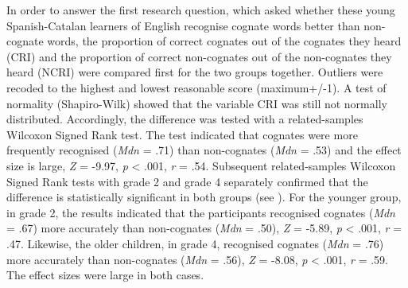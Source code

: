 \documentclass[output=paper,modfonts,nonflat,newtxmath]{langsci/langscibook}
\begin{document}
\begin{table}
\caption{Descriptive statistics}
\label{tab:munoz:1}
\end{table}

{In order to answer the first research question, which asked whether these young Spanish-Catalan learners of English recognise cognate words better than non-cognate words, the proportion of correct cognates out of the cognates they heard (CRI) and the proportion of correct non-cognates out of the non-cognates they heard (NCRI) were compared first for the two groups together. Outliers were recoded to the highest and lowest reasonable score (maximum+/-1). A test of normality (Shapiro-Wilk) showed that the variable CRI was still not normally distributed. Accordingly, the difference was tested with a related-samples Wilcoxon Signed Rank test. The test indicated that cognates were more frequently recognised (}{\textit{Mdn}} {= .71) than non-cognates (}{\textit{Mdn}} {= .53) and the effect size is large,} {\textit{Z} }{= -9.97,} {\textit{p} }{< .001,} {\textit{r} }{= .54. Subsequent related-samples Wilcoxon Signed Rank tests with grade 2 and grade 4 separately confirmed that the difference is statistically significant in both groups (see ). For the younger group, in grade 2, the results indicated that the participants recognised cognates (}{\textit{Mdn}} {= .67) more accurately than non-cognates (}{\textit{Mdn}} {= .50),} {\textit{Z} }{= -5.89,} {\textit{p} }{< .001,} {\textit{r} }{= .47. Likewise, the older children, in grade 4, recognised cognates (}{\textit{Mdn}} {= .76) more accurately than non-cognates (}{\textit{Mdn}} {= .56),} {\textit{Z} }{= -8.08,} {\textit{p} }{< .001,} {\textit{r} }{= .59. The effect sizes were large in both cases.}
\end{document}
